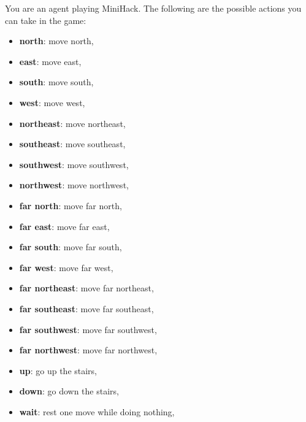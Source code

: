 \begin{MyGreenBox}
	[frametitle={\textbf{Iteration 2 MiniHack Prompt}}] You are an agent playing MiniHack.
	The following are the possible actions you can take in the game:

	\begin{itemize}
		\item \textbf{north}: move north,

		\item \textbf{east}: move east,

		\item \textbf{south}: move south,

		\item \textbf{west}: move west,

		\item \textbf{northeast}: move northeast,

		\item \textbf{southeast}: move southeast,

		\item \textbf{southwest}: move southwest,

		\item \textbf{northwest}: move northwest,

		\item \textbf{far north}: move far north,

		\item \textbf{far east}: move far east,

		\item \textbf{far south}: move far south,

		\item \textbf{far west}: move far west,

		\item \textbf{far northeast}: move far northeast,

		\item \textbf{far southeast}: move far southeast,

		\item \textbf{far southwest}: move far southwest,

		\item \textbf{far northwest}: move far northwest,

		\item \textbf{up}: go up the stairs,

		\item \textbf{down}: go down the stairs,

		\item \textbf{wait}: rest one move while doing nothing,


\end{itemize}
\end{MyGreenBox}
